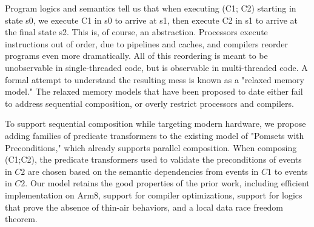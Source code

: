 Program logics and semantics tell us that when executing (C1; C2) starting in
state s0, we execute C1 in s0 to arrive at s1, then execute C2 in s1 to
arrive at the final state s2. This is, of course, an abstraction. Processors
execute instructions out of order, due to pipelines and caches, and compilers
reorder programs even more dramatically. All of this reordering is meant to
be unobservable in single-threaded code, but is observable in multi-threaded
code. A formal attempt to understand the resulting mess is known as a
"relaxed memory model." The relaxed memory models that have been proposed to
date either fail to address sequential composition, or overly restrict
processors and compilers.

To support sequential composition while targeting modern hardware, we propose
adding families of predicate transformers to the existing model of "Pomsets
with Preconditions," which already supports parallel composition.  When
composing (C1;C2), the predicate transformers used to validate the
preconditions of events in $C2$ are chosen based on the semantic
dependencies from events in $C1$ to events in $C2$.  Our model retains the
good properties of the prior work, including efficient implementation on
Arm8, support for compiler optimizations, support for logics that prove the
absence of thin-air behaviors, and a local data race freedom theorem.

